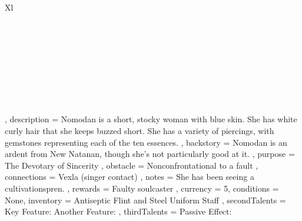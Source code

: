 \documentclass[article,stormlight,character-sheet]{plotweaver}
\begin{document}
{{\begin{NiceTabularX}{\linewidth}{Xl}
                \GoalRow \\
                \GoalRow \\
                \GoalRow \\
                \GoalRow \\
                \GoalRow \\
                \GoalRow \\
                \GoalRow \\
                \GoalRow \\
                \GoalRow \\
            \end{NiceTabularX}
        },
        description = {
            Nomodan is a short, stocky woman with blue skin. She has white curly hair that she keeps buzzed short. She has a variety of piercings, with gemstones representing each of the ten essences.
        },
        backstory = {
            Nomodan is an ardent from New Natanan, though she's not particularly good at it.
        },
        purpose = {
            The Devotary of Sincerity
        },
        obstacle = {
            Nonconfrontational to a fault
        },
        connections = {
            Vexla (singer contact)
        },
        notes = {
            She has been seeing a cultivationspren.
        },
        rewards = {
            Faulty soulcaster
        },
        currency = {\Huge5},
        conditions = None,
        inventory = {
            Antiseptic
            \newline
            Flint and Steel
            \newline
            Uniform
            \newline
            Staff
        },
        secondTalents = {
            \key Key Feature: \lipsum[1][2]
            \bigskip\newline
            \key Another Feature: \lipsum[1][3]
        },
        thirdTalents = {
            \forever Passive Effect: \lipsum[1][4]
        }
    }
\end{document}
